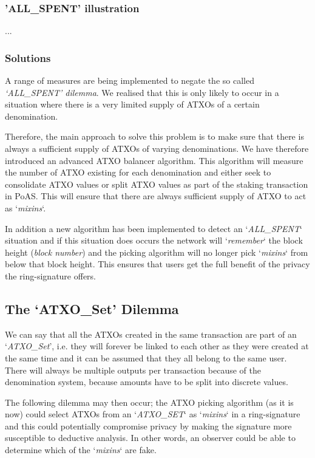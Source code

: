 \subsubsection{'ALL\_SPENT' illustration}

...

\subsubsection{Solutions}
A range of measures are being implemented to negate the so called
\textit{‘ALL\_SPENT’ dilemma}. We realised that this is only likely
to occur in a situation where there is a very limited supply of
ATXOs of a certain denomination.

Therefore, the main approach to solve this problem is to make sure that
there is always a sufficient supply of ATXOs of varying denominations.
We have therefore introduced an advanced ATXO balancer algorithm. This
algorithm will measure the number of ATXO existing for each denomination
and either seek to consolidate ATXO values or split ATXO values as part
of the staking transaction in PoAS. This will ensure that there are
always sufficient supply of ATXO to act as ‘\textit{mixins}‘.



In addition a new algorithm has been implemented to detect an
‘\textit{ALL\_SPENT}‘ situation and if this situation does occurs
the network will ‘\textit{remember}‘ the block height (\textit{block number})
and the picking algorithm will no longer pick ‘\textit{mixins}‘
from below that block height. This ensures that users get the full
benefit of the privacy the ring-signature offers.



\subsection{The ‘ATXO\_Set’ Dilemma}

We can say that all the ATXOs created in the same transaction are part
of an ‘\textit{ATXO\_Set}’, i.e. they will forever be linked to each
other as they were created at the same time and it can be assumed that
they all belong to the same user. There will always be multiple outputs
per transaction because of the denomination system, because amounts
have to be split into discrete values.



The following dilemma may then occur; the ATXO picking algorithm (as it is
now) could select ATXOs from an ‘\textit{ATXO\_SET}‘ as ‘\textit{mixins}‘
in a ring-signature and this could potentially compromise privacy by making
the signature more susceptible to deductive analysis. In other words, an
observer could be able to determine which of the ‘\textit{mixins}‘ are fake.



